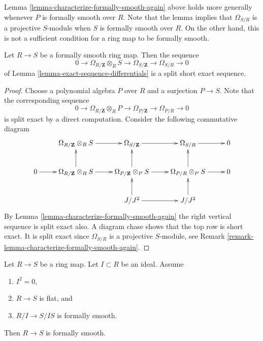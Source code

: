\begin{remark}
\label{remark-lemma-characterize-formally-smooth-again}
Lemma \ref{lemma-characterize-formally-smooth-again} above holds more
generally whenever $P$ is formally smooth over $R$. Note that the lemma
implies that $\Omega_{S/R}$ is a projective $S$-module when $S$ is
formally smooth over $R$. On the other hand, this is not a sufficient
condition for a ring map to be formally smooth.
\end{remark}

\begin{lemma}
\label{lemma-ses-formally-smooth}
Let $R \to S$ be a formally smooth ring map.
Then the sequence
$$
0 \to \Omega_{R/\mathbf{Z}} \otimes_R S
\to \Omega_{S/\mathbf{Z}}
\to \Omega_{S/R} \to 0
$$
of Lemma \ref{lemma-exact-sequence-differentials}
is a split short exact sequence.
\end{lemma}

\begin{proof}
Choose a polynomial algebra $P$ over $R$ and a surjection
$P \to S$. Note that the corresponding sequence
$$
0 \to \Omega_{R/\mathbf{Z}} \otimes_R P
\to \Omega_{P/\mathbf{Z}}
\to \Omega_{P/R} \to 0
$$
is split exact by a direct computation.
Consider the following commutative diagram
$$
\xymatrix{
&
\Omega_{R/\mathbf{Z}} \otimes_R S \ar[r] &
\Omega_{S/\mathbf{Z}} \ar[r] &
\Omega_{S/R} \ar[r] & 0 \\
0 \ar[r] &
\Omega_{R/\mathbf{Z}} \otimes_R S \ar[r] \ar[u] &
\Omega_{P/\mathbf{Z}} \otimes_P S \ar[r] \ar[u] &
\Omega_{P/R} \otimes_P S \ar[r] \ar[u] & 0 \\
& & J/J^2 \ar[r] \ar[u] & J/J^2 \ar[u]
}
$$
By Lemma \ref{lemma-characterize-formally-smooth-again}
the right vertical sequence is split exact also.
A diagram chase shows that the top row is short exact.
It is split exact since $\Omega_{S/R}$ is a projective $S$-module,
see Remark \ref{remark-lemma-characterize-formally-smooth-again}.
\end{proof}

\begin{lemma}
\label{lemma-lift-formal-smoothness}
Let $R \to S$ be a ring map.
Let $I \subset R$ be an ideal. Assume
\begin{enumerate}
\item $I^2 = 0$,
\item $R \to S$ is flat, and
\item $R/I \to S/IS$ is formally smooth.
\end{enumerate}
Then $R \to S$ is formally smooth.
\end{lemma}

